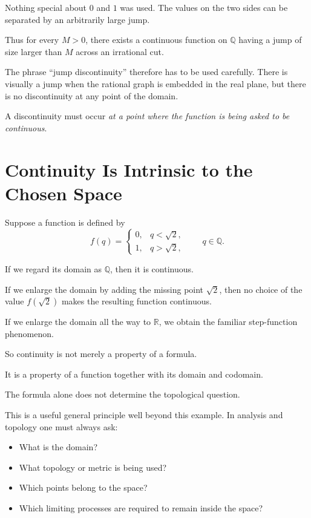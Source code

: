 \documentclass{essay}
\begin{document}
Nothing special about \(0\) and \(1\) was used. The values on the two sides
can be separated by an arbitrarily large jump.

Thus for every \(M>0\), there exists a continuous function on
\(\mathbb{Q}\) having a jump of size larger than \(M\) across an irrational
cut.

The phrase ``jump discontinuity'' therefore has to be used carefully.
There is visually a jump when the rational graph is embedded in the real
plane, but there is no discontinuity at any point of the domain.

A discontinuity must occur \emph{at a point where the function is being asked
to be continuous}.

\section{Continuity Is Intrinsic to the Chosen Space}

Suppose a function is defined by
\[
  f(q)=
  \begin{cases}
    0,&q<\sqrt{2},\\
    1,&q>\sqrt{2},
  \end{cases}
  \qquad q\in\mathbb{Q}.
\]

If we regard its domain as \(\mathbb{Q}\), then it is continuous.

If we enlarge the domain by adding the missing point \(\sqrt{2}\), then no
choice of the value \(f(\sqrt{2})\) makes the resulting function continuous.

If we enlarge the domain all the way to \(\mathbb{R}\), we obtain the familiar
step-function phenomenon.

So continuity is not merely a property of a formula.

It is a property of a function together with its domain and codomain.

The formula alone does not determine the topological question.

This is a useful general principle well beyond this example. In analysis and
topology one must always ask:

\begin{itemize}
  \item What is the domain?
  \item What topology or metric is being used?
  \item Which points belong to the space?
  \item Which limiting processes are required to remain inside the space?
\end{itemize}
\end{document}

